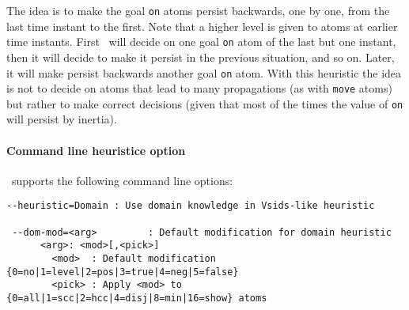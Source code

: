  The idea is to make the goal \texttt{on} atoms persist backwards, one by one, from the last time instant to the first.
 Note that a higher level is given to atoms at earlier time instants.
 First \clasp\ will decide on one goal \texttt{on} atom of the last but one instant,
 then it will decide to make it persist in the previous situation, and so on.
 Later, it will make persist backwards another goal \texttt{on} atom.
 With this heuristic the idea is not to decide on atoms that lead to many propagations (as with \texttt{move} atoms)
 but rather to make correct decisions (given that most of the times the value of \texttt{on} will persist by inertia).


 \paragraph{Command line heuristice option}
 \clasp\ supports the following command line options:
{
\scriptsize\begin{lstlisting}[numbers=none]
 --heuristic=Domain : Use domain knowledge in Vsids-like heuristic

 --dom-mod=<arg>         : Default modification for domain heuristic
      <arg>: <mod>[,<pick>]
        <mod>  : Default modification {0=no|1=level|2=pos|3=true|4=neg|5=false}
        <pick> : Apply <mod> to {0=all|1=scc|2=hcc|4=disj|8=min|16=show} atoms
\end{lstlisting}
}

\iffalse

\fi

